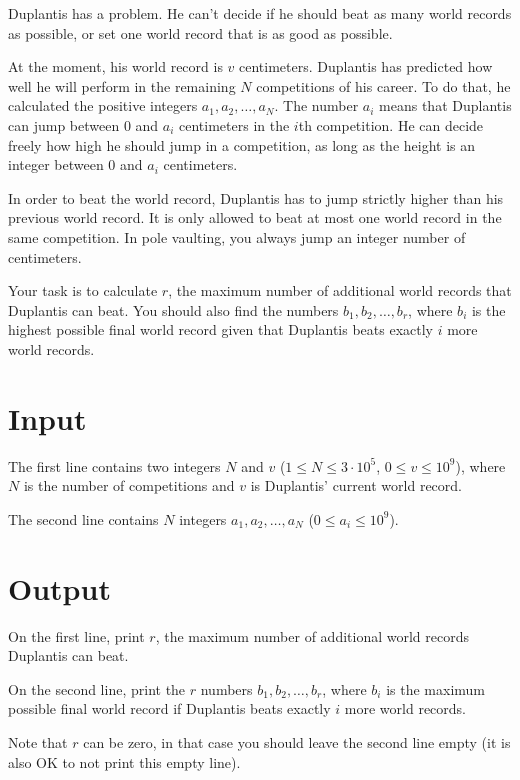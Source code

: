 \noindent

Duplantis has a problem. He can't decide if he should beat as many world records as possible, or set one world record that is as good 
as possible.

At the moment, his world record is $v$ centimeters. Duplantis has predicted how well he will perform in the remaining $N$ competitions
of his career. To do that, he calculated the positive integers $a_1, a_2, \dots, a_N$. The number $a_i$ means that Duplantis can jump between 
$0$ and $a_i$ centimeters in the $i$th competition. He can decide freely how high he should jump in a competition, as long as the height is 
an integer between $0$ and $a_i$ centimeters.

In order to beat the world record, Duplantis has to jump strictly higher than his previous world record. It is only allowed to beat at most 
one world record in the same competition. In pole vaulting, you always jump an integer number of centimeters.

Your task is to calculate $r$, the maximum number of additional world records that Duplantis can beat. You should also find the numbers 
$b_1, b_2, \dots, b_r$, where $b_i$ is the highest possible final world record given that Duplantis beats exactly $i$ more world records.

\section*{Input}

The first line contains two integers $N$ and $v$ ($1 \leq N \leq 3 \cdot 10^5$, $0 \leq v \leq 10^9$), where $N$ is the number of competitions
and $v$ is Duplantis' current world record. 

The second line contains $N$ integers $a_1, a_2, \dots, a_N$ ($0 \leq a_i \leq 10^9$). 


\section*{Output}

On the first line, print $r$, the maximum number of additional world records Duplantis can beat.

On the second line, print the $r$ numbers $b_1, b_2, \dots, b_r$, where $b_i$ is the maximum possible final world record if Duplantis
beats exactly $i$ more world records.

Note that $r$ can be zero, in that case you should leave the second line empty (it is also OK to not print this empty line).


